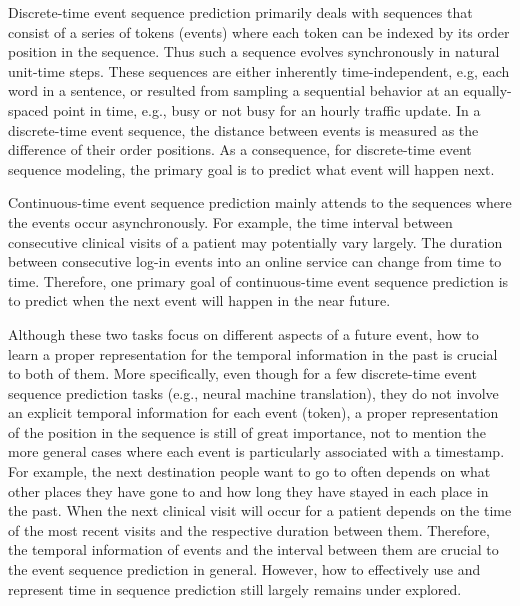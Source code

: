 \documentclass{article} %
\begin{document}
Discrete-time event sequence prediction primarily deals with sequences that consist of a series of tokens (events) where each token can be indexed by its order position in the sequence. Thus such a sequence evolves synchronously in natural unit-time steps. These sequences are either inherently time-independent, e.g, each word in a sentence, or resulted from sampling a sequential behavior at an equally-spaced point in time, e.g., busy or not busy for an hourly traffic update. In a discrete-time event sequence, the distance between events is measured as the difference of their order positions. As a consequence, for discrete-time event sequence modeling, the primary goal is to predict what event will happen next. 

Continuous-time event sequence prediction mainly attends to the sequences where the events occur asynchronously. For example, the time interval between consecutive clinical visits of a patient may potentially vary largely. The duration between consecutive log-in events into an online service can change from time to time. Therefore, one primary goal of continuous-time event sequence prediction is to predict when the next event will happen in the near future.

Although these two tasks focus on different aspects of a future event, how to learn a proper representation for the temporal information in the past is crucial to both of them. More specifically, even though for a few discrete-time event sequence prediction tasks (e.g., neural machine translation), they do not involve an explicit temporal information for each event (token), a proper representation of the position in the sequence is still of great importance, not to mention the more general cases where each event is particularly associated with a timestamp. For example, the next destination people want to go to often depends on what other places they have gone to and how long they have stayed in each place in the past. When the next clinical visit \citep{Choi16} will occur for a patient depends on the time of the most recent visits and the respective duration between them. Therefore, the temporal information of events and the interval between them are crucial to the event sequence prediction in general. However, how to effectively use and represent time in sequence prediction still largely remains under explored.
\end{document}
